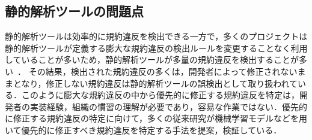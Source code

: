 \documentclass[T,J]{fose} %
\begin{document}



\subsection{静的解析ツールの問題点}

静的解析ツールは効率的に規約違反を検出できる一方で，多くのプロジェクトは静的解析ツールが定義する膨大な規約違反の検出ルールを変更することなく利用していることが多いため，静的解析ツールが多量の規約違反を検出することが多い~\cite{}．
その結果，検出された規約違反の多くは，開発者によって修正されないままとなり，修正しない規約違反は静的解析ツールの誤検出として取り扱われている．このように膨大な規約違反の中から優先的に修正する規約違反を特定は，開発者の実装経験，組織の慣習の理解が必要であり，容易な作業ではない\cite{HowFar}\cite{shuseisarenai}．優先的に修正する規約違反の特定に向けて，多くの従来研究が機械学習モデルなどを用いて優先的に修正すべき規約違反を特定する手法を提案，検証している．
\end{document}

